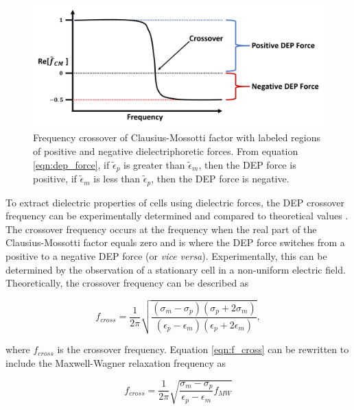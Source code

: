 \begin{figure}[ht]
 \centering
 \includegraphics[width=\textwidth]{images/DEPCrossover.png}
 \caption[Frequency crossover of Clausius-Mossotti factor] {Frequency crossover of Clausius-Mossotti factor with labeled regions of positive and negative dielectriphoretic forces. From equation \ref{eqn:dep_force}, if $\tilde{\epsilon}_p$ is greater than $\tilde{\epsilon}_m$, then the DEP force is positive, if $\tilde{\epsilon}_m$ is less than $\tilde{\epsilon}_p$, then the DEP force is negative.}
 \label{fig:freq_crossover}
\end{figure}
 
 \par To extract dielectric properties of cells using dielectric forces, the DEP crossover frequency can be experimentally determined and compared to theoretical values \cite{morgan_single_2007}. The crossover frequency occurs at the frequency when the real part of the Clausius-Mossotti factor equals zero and is where the DEP force switches from a positive to a negative DEP force (or \textit{vice versa}). Experimentally, this can be determined by the observation of a stationary cell in a non-uniform electric field. Theoretically, the crossover frequency can be described as
 
 \begin{equation}
     f_{cross} = \frac{1}{2 \pi}\sqrt{\frac{(\sigma_m-\sigma_p)(\sigma_p+2\sigma_m)}{(\epsilon_p-\epsilon_m)(\epsilon_p+2\epsilon_m)}},
     \label{eqn:f_cross}
 \end{equation}
  
 \noindent where $f_{cross}$ is the crossover frequency. Equation \ref{eqn:f_cross} can be rewritten to include the Maxwell-Wagner relaxation frequency as \cite{morgan_single_2007}
 
 \begin{equation}
    f_{cross} = \frac{1}{2 \pi} \sqrt{\frac{\sigma_m - \sigma_p}{\epsilon_p - \epsilon_m}f_{MW}}
 \end{equation}
 
